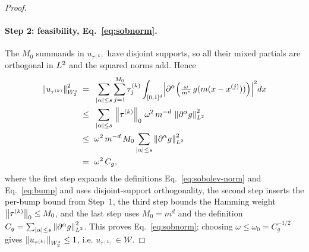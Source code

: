 \begin{proof}
\paragraph{Step 2: feasibility, Eq.~\eqref{eq:sobnorm}.}
The $M_0$ summands in $u_{\tau^{(k)}}$ have disjoint supports, so all their
mixed partials are orthogonal in $L^{2}$ and the squared norms add. Hence
\begin{align*}
\left\| u_{\tau^{(k)}} \right\|_{W^{s}_{2}}^2
\;=\; & ~ \sum_{|\alpha|\le s}\sum_{j=1}^{M_0}\tau^{(k)}_j
        \int_{[0,1]^d}\Bigl|\partial^{\alpha}\Bigl(\tfrac{\omega}{m^{s}}\,g(m(x-x^{(j)}))\Bigr)\Bigr|^2 dx \\
\;\le\; & ~ \sum_{|\alpha|\le s}\,\left\| \tau^{(k)} \right\|_{0}\,\omega^2\,m^{-d}\,\left\| \partial^{\alpha}g \right\|_{L^{2}}^2 \\
\;\le\; & ~ \omega^2\,m^{-d}\,M_0\sum_{|\alpha|\le s}\left\| \partial^{\alpha}g \right\|_{L^{2}}^2 \\
\;=\; & ~ \omega^2\,C_g,
\end{align*}
where the first step expands the definitions Eq.~\eqref{eq:sobolev-norm} and
Eq.~\eqref{eq:bump} and uses disjoint-support orthogonality, the second step
inserts the per-bump bound from Step~1, the third step bounds the Hamming
weight $\left\| \tau^{(k)} \right\|_{0}\le M_0$, and the last step uses $M_0=m^d$ and the
definition $C_g=\sum_{|\alpha|\le s}\left\| \partial^{\alpha}g \right\|_{L^{2}}^2$. This
proves Eq.~\eqref{eq:sobnorm}; choosing $\omega\le\omega_0=C_g^{-1/2}$ gives
$\left\| u_{\tau^{(k)}} \right\|_{W^{s}_{2}}\le 1$, i.e. $u_{\tau^{(k)}}\in\mathcal{W}$.


\end{proof}
